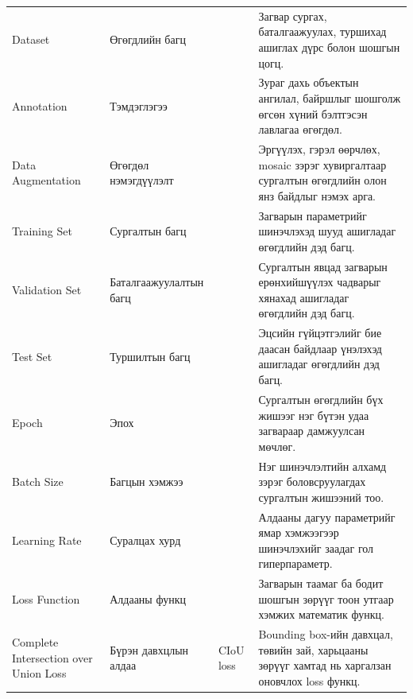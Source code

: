 {\begin{longtable}{P{0.22} P{0.20} P{0.10} P{0.40}}
Dataset & Өгөгдлийн багц &  & Загвар сургах, баталгаажуулах, туршихад ашиглах дүрс болон шошгын цогц. \\
Annotation & Тэмдэглэгээ &  & Зураг дахь объектын ангилал, байршлыг шошголж өгсөн хүний бэлтгэсэн лавлагаа өгөгдөл. \\
Data Augmentation & Өгөгдөл нэмэгдүүлэлт &  & Эргүүлэх, гэрэл өөрчлөх, mosaic зэрэг хувиргалтаар сургалтын өгөгдлийн олон янз байдлыг нэмэх арга. \\
Training Set & Сургалтын багц &  & Загварын параметрийг шинэчлэхэд шууд ашигладаг өгөгдлийн дэд багц. \\
Validation Set & Баталгаажуулалтын багц &  & Сургалтын явцад загварын ерөнхийшүүлэх чадварыг хянахад ашигладаг өгөгдлийн дэд багц. \\
Test Set & Туршилтын багц &  & Эцсийн гүйцэтгэлийг бие даасан байдлаар үнэлэхэд ашигладаг өгөгдлийн дэд багц. \\
Epoch & Эпох &  & Сургалтын өгөгдлийн бүх жишээг нэг бүтэн удаа загвараар дамжуулсан мөчлөг. \\
Batch Size & Багцын хэмжээ &  & Нэг шинэчлэлтийн алхамд зэрэг боловсруулагдах сургалтын жишээний тоо. \\
Learning Rate & Суралцах хурд &  & Алдааны дагуу параметрийг ямар хэмжээгээр шинэчлэхийг заадаг гол гиперпараметр. \\
Loss Function & Алдааны функц &  & Загварын таамаг ба бодит шошгын зөрүүг тоон утгаар хэмжих математик функц. \\
Complete Intersection over Union Loss & Бүрэн давхцлын алдаа & CIoU loss & Bounding box-ийн давхцал, төвийн зай, харьцааны зөрүүг хамтад нь харгалзан оновчлох loss функц. \\
\midrule


\end{longtable}}
